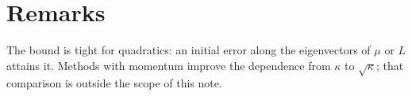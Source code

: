 \documentclass[11pt,a4paper]{article}
\theoremstyle{definition}
\begin{document}
\section{Remarks}

The bound is tight for quadratics: an initial error along the eigenvectors of $\mu$ or $L$
attains it. Methods with momentum improve the dependence from $\kappa$ to $\sqrt{\kappa}$;
that comparison is outside the scope of this note.
\end{document}
